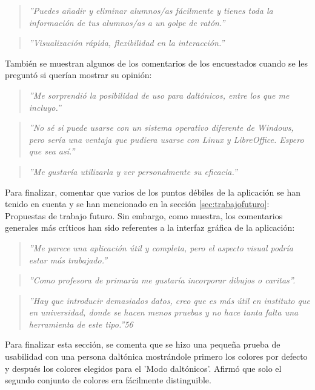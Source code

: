 \begin{quote}
\textit{''Puedes añadir y eliminar alumnos/as fácilmente y tienes toda la información de tus alumnos/as a un golpe de ratón.''}
\end{quote}

\begin{quote}
\textit{''Visualización rápida, flexibilidad en la interacción.''}
\end{quote}

También se muestran algunos de los comentarios de los encuestados cuando se les preguntó si querían mostrar su opinión:
\begin{quote}
\textit{''Me sorprendió la posibilidad de uso para daltónicos, entre los que me incluyo.''}
\end{quote}

\begin{quote}
\textit{''No sé si puede usarse con un sistema operativo diferente de Windows, pero sería una ventaja que pudiera usarse con Linux y LibreOffice. Espero que sea así.''}
\end{quote}

\begin{quote}
\textit{''Me gustaría utilizarla y ver personalmente su eficacia.''}
\end{quote}

Para finalizar, comentar que varios de los puntos débiles de la aplicación se han tenido en cuenta y se han mencionado en la sección \ref{sec:trabajofuturo}: Propuestas de trabajo futuro. Sin embargo, como muestra, los comentarios generales más críticos han sido referentes a la interfaz gráfica de la aplicación:

\begin{quote}
\textit{''Me parece una aplicación útil y completa, pero el aspecto visual podría estar más trabajado.''}
\end{quote}

\begin{quote}
\textit{''Como profesora de primaria me gustaría incorporar dibujos o caritas''.}
\end{quote}

\begin{quote}
\textit{''Hay que introducir demasiados datos, creo que es más útil en instituto que en universidad, donde se hacen menos pruebas y no hace tanta falta una herramienta de este tipo.''56}
\end{quote}

Para finalizar esta sección, se comenta que se hizo una pequeña prueba de usabilidad con una persona daltónica mostrándole primero los colores por defecto y después los colores elegidos para el 'Modo daltónicos'. Afirmó que solo el segundo conjunto de colores era fácilmente distinguible.

